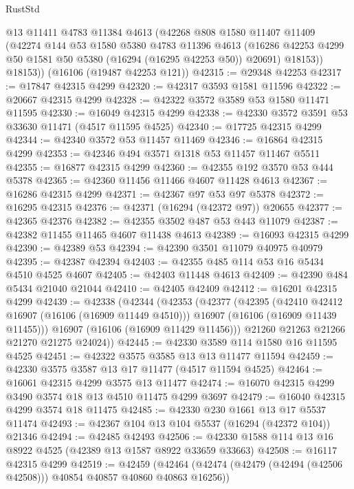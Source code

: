 \begin{lexlean}{RustStd}
\begin{coremodule}
        @13
        @11411
        @4783
        @11384
        @4613
        (@42268
          @808
          @1580
          @11407
          @11409
          (@42274
            @144
            @53
            @1580
            @5380
            @4783
            @11396
            @4613
            (@16286 @42253 @4299 @50 @1581 @50 @5380 (@16294 (@16295 @42253 @50)) @20691)
            @18153))
        @18153))
    (@16106 (@19487 @42253 @121))
@42315 := @29348 @42253
@42317 := @17847 @42315 @4299
@42320 := @42317 @3593 @1581 @11596
@42322 := @20667 @42315 @4299
@42328 := @42322 @3572 @3589 @53 @1580 @11471 @11595
@42330 := @16049 @42315 @4299
@42338 := @42330 @3572 @3591 @53 @33630 @11471 (@4517 @11595 @4525)
@42340 := @17725 @42315 @4299
@42344 := @42340 @3572 @53 @11457 @11469
@42346 := @16864 @42315 @4299
@42353 := @42346 @494 @3571 @1318 @53 @11457 @11467 @5511
@42355 := @16877 @42315 @4299
@42360 := @42355 @192 @3570 @53 @444 @5378
@42365 := @42360 @11456 @11466 @4607 @11428 @4613
@42367 := @16286 @42315 @4299
@42371 := @42367 @97 @53 @97 @5378
@42372 := @16295 @42315
@42376 := @42371 (@16294 (@42372 @97)) @20655
@42377 := @42365 @42376
@42382 := @42355 @3502 @487 @53 @443 @11079
@42387 := @42382 @11455 @11465 @4607 @11438 @4613
@42389 := @16093 @42315 @4299
@42390 := @42389 @53
@42394 := @42390 @3501 @11079 @40975 @40979
@42395 := @42387 @42394
@42403 := @42355 @485 @114 @53 @16 @5434 @4510 @4525 @4607
@42405 := @42403 @11448 @4613
@42409 := @42390 @484 @5434 @21040 @21044
@42410 := @42405 @42409
@42412 := @16201 @42315 @4299
@42439 := @42338
    (@42344
      (@42353
        (@42377
          (@42395
            (@42410 @42412 @16907 (@16106 (@16909 @11449 @4510)))
            @16907
            (@16106 (@16909 @11439 @11455)))
          @16907
          (@16106 (@16909 @11429 @11456)))
        @21260
        @21263
        @21266
        @21270
        @21275
        @24024))
@42445 := @42330 @3589 @114 @1580 @16 @11595 @4525
@42451 := @42322 @3575 @3585 @13 @13 @11477 @11594
@42459 := @42330 @3575 @3587 @13 @17 @11477 (@4517 @11594 @4525)
@42464 := @16061 @42315 @4299 @3575 @13 @11477
@42474 := @16070 @42315 @4299 @3490 @3574 @18 @13 @4510 @11475 @4299 @3697
@42479 := @16040 @42315 @4299 @3574 @18 @11475
@42485 := @42330 @230 @1661 @13 @17 @5537 @11474
@42493 := @42367 @104 @13 @104 @5537 (@16294 (@42372 @104)) @21346
@42494 := @42485 @42493
@42506 := @42330 @1588 @114 @13 @16 @8922 @4525 (@42389 @13 @1587 @8922 @33659 @33663)
@42508 := @16117 @42315 @4299
@42519 := @42459
    (@42464 (@42474 (@42479 (@42494 (@42506 @42508))) @40854 @40857 @40860 @40863 @16256))

\end{coremodule}
\end{lexlean}
